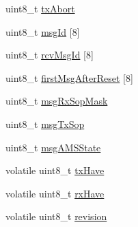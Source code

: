 \begin{DoxyCompactItemize}
uint8\-\_\-t \hyperlink{struct____pd__phy__tcpc__instance___a95990260c9d5be8724a2feca748ee3da}{tx\-Abort}
\item 
uint8\-\_\-t \hyperlink{struct____pd__phy__tcpc__instance___a6a94c29840da978ce0d5d0da545cf57f}{msg\-Id} \mbox{[}8\mbox{]}
\item 
uint8\-\_\-t \hyperlink{struct____pd__phy__tcpc__instance___a48ed369a0454eb7ee62d935801db2018}{rcv\-Msg\-Id} \mbox{[}8\mbox{]}
\item 
uint8\-\_\-t \hyperlink{struct____pd__phy__tcpc__instance___a2551b07e2795fdd33e05f05dfad8f211}{first\-Msg\-After\-Reset} \mbox{[}8\mbox{]}
\item 
uint8\-\_\-t \hyperlink{struct____pd__phy__tcpc__instance___ab4f0c543ff4b3ad2293c07da59f94aaf}{msg\-Rx\-Sop\-Mask}
\item 
uint8\-\_\-t \hyperlink{struct____pd__phy__tcpc__instance___a3f43dcc28b084f1a3a2d05c3821290d9}{msg\-Tx\-Sop}
\item 
uint8\-\_\-t \hyperlink{struct____pd__phy__tcpc__instance___a4be0d51647641b8fbf79c0307bac4db5}{msg\-A\-M\-S\-State}
\item 
volatile uint8\-\_\-t \hyperlink{struct____pd__phy__tcpc__instance___a2f5f0754a16062bcf9c7572d8c3b5bd7}{tx\-Have}
\item 
volatile uint8\-\_\-t \hyperlink{struct____pd__phy__tcpc__instance___a1e81356f89f625e8c0bd9436e7352fb3}{rx\-Have}
\item 
volatile uint8\-\_\-t \hyperlink{struct____pd__phy__tcpc__instance___a31fe4873d6a4ddce98b3105eccad7cee}{revision}
\end{DoxyCompactItemize}


